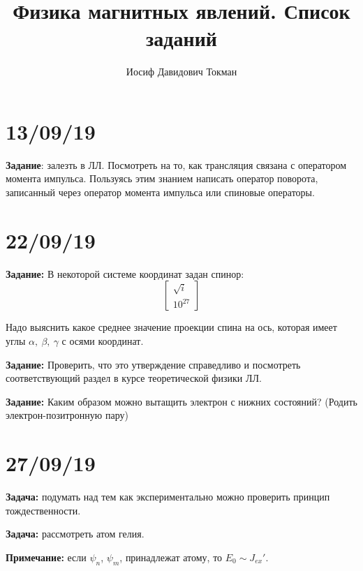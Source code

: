 \documentclass[a4paper, 14pt, russian]{article}
\title{Физика магнитных явлений. Список заданий}
\author{Иосиф Давидович Токман}
\date{}
\newcommand{\be}{\begin{equation}}
\newcommand{\ee}{\end{equation}}
\begin{document}
	\maketitle

	\section{13/09/19}

	\begin{tcolorbox}
		\textbf{Задание}: залезть в ЛЛ. Посмотреть на то, как трансляция связана с 
		оператором момента импульса. Пользуясь этим знанием написать оператор 
		поворота, записанный через оператор момента импульса или спиновые операторы.
	\end{tcolorbox}

	\section{22/09/19}

	\begin{tcolorbox}
		\textbf{Задание:} В некоторой системе координат задан спинор:
		\be
			\begin{bmatrix}
				\sqrt{i}\\
				10^{27}
			\end{bmatrix}
		\ee

		Надо выяснить какое среднее значение проекции спина на ось, которая 
		имеет углы $\alpha,~\beta,~\gamma$ с осями координат.
	\end{tcolorbox}
	\begin{tcolorbox}
		\textbf{Задание:} Проверить, что это утверждение справедливо 
		и посмотреть соответствующий раздел в курсе теоретической физики ЛЛ.
	\end{tcolorbox}
	\begin{tcolorbox}
		\textbf{Задание:} Каким образом можно вытащить электрон с нижних состояний? 
		(Родить электрон-позитронную пару)
	\end{tcolorbox}

	\section{27/09/19}

	\begin{tcolorbox}
		\textbf{Задача:} подумать над тем как экспериментально можно
		проверить принцип тождественности.
	\end{tcolorbox}
	\begin{tcolorbox}
		\textbf{Задача:} рассмотреть атом гелия.

		\textbf{Примечание:} если $\psi_n$, $\psi_m$,
		принадлежат атому, то $E_0 \sim J_{ex}'$.
	\end{tcolorbox}
\end{document}
